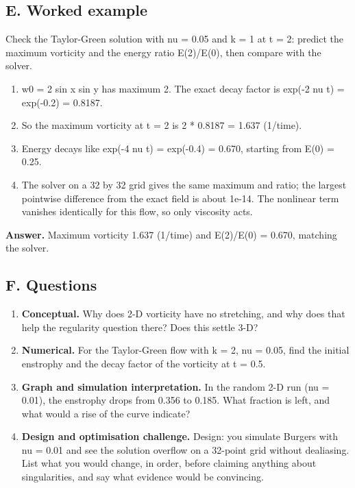 \documentclass[11pt,a4paper]{article}
\begin{document}
\subsection*{E. Worked example}
Check the Taylor-Green solution with nu = 0.05 and k = 1 at t = 2: predict the maximum vorticity and the energy ratio E(2)/E(0), then compare with the solver.
\begin{enumerate}[nosep]
\item w0 = 2 sin x sin y has maximum 2. The exact decay factor is exp(-2 nu t) = exp(-0.2) = 0.8187.
\item So the maximum vorticity at t = 2 is 2 * 0.8187 = 1.637 (1/time).
\item Energy decays like exp(-4 nu t) = exp(-0.4) = 0.670, starting from E(0) = 0.25.
\item The solver on a 32 by 32 grid gives the same maximum and ratio; the largest pointwise difference from the exact field is about 1e-14. The nonlinear term vanishes identically for this flow, so only viscosity acts.
\end{enumerate}
\textbf{Answer.} Maximum vorticity 1.637 (1/time) and E(2)/E(0) = 0.670, matching the solver.

\subsection*{F. Questions}
\begin{enumerate}[nosep]
\item \textbf{Conceptual.} Why does 2-D vorticity have no stretching, and why does that help the regularity question there? Does this settle 3-D?
\item \textbf{Numerical.} For the Taylor-Green flow with k = 2, nu = 0.05, find the initial enstrophy and the decay factor of the vorticity at t = 0.5.
\item \textbf{Graph and simulation interpretation.} In the random 2-D run (nu = 0.01), the enstrophy drops from 0.356 to 0.185. What fraction is left, and what would a rise of the curve indicate?
\item \textbf{Design and optimisation challenge.} Design: you simulate Burgers with nu = 0.01 and see the solution overflow on a 32-point grid without dealiasing. List what you would change, in order, before claiming anything about singularities, and say what evidence would be convincing.
\end{enumerate}
\end{document}
